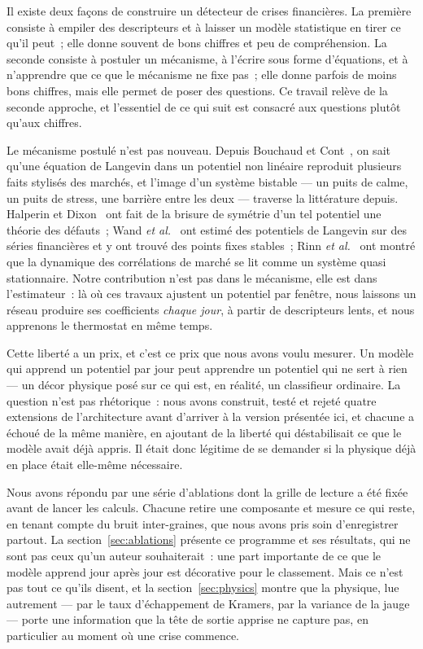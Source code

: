 \documentclass[11pt,a4paper]{article}
\begin{document}
Il existe deux façons de construire un détecteur de crises financières. La première consiste à empiler des descripteurs et à laisser un modèle statistique en tirer ce qu'il peut~; elle donne souvent de bons chiffres et peu de compréhension. La seconde consiste à postuler un mécanisme, à l'écrire sous forme d'équations, et à n'apprendre que ce que le mécanisme ne fixe pas~; elle donne parfois de moins bons chiffres, mais elle permet de poser des questions. Ce travail relève de la seconde approche, et l'essentiel de ce qui suit est consacré aux questions plutôt qu'aux chiffres.

Le mécanisme postulé n'est pas nouveau. Depuis Bouchaud et Cont~\cite{bouchaud1998}, on sait qu'une équation de Langevin dans un potentiel non linéaire reproduit plusieurs faits stylisés des marchés, et l'image d'un système bistable --- un puits de calme, un puits de stress, une barrière entre les deux --- traverse la littérature depuis. Halperin et Dixon~\cite{halperin2019} ont fait de la brisure de symétrie d'un tel potentiel une théorie des défauts~; Wand \emph{et al.}~\cite{wand2024} ont estimé des potentiels de Langevin sur des séries financières et y ont trouvé des points fixes stables~; Rinn \emph{et al.}~\cite{rinn2015} ont montré que la dynamique des corrélations de marché se lit comme un système quasi stationnaire. Notre contribution n'est pas dans le mécanisme, elle est dans l'estimateur~: là où ces travaux ajustent un potentiel par fenêtre, nous laissons un réseau produire ses coefficients \emph{chaque jour}, à partir de descripteurs lents, et nous apprenons le thermostat en même temps.

Cette liberté a un prix, et c'est ce prix que nous avons voulu mesurer. Un modèle qui apprend un potentiel par jour peut apprendre un potentiel qui ne sert à rien --- un décor physique posé sur ce qui est, en réalité, un classifieur ordinaire. La question n'est pas rhétorique~: nous avons construit, testé et rejeté quatre extensions de l'architecture avant d'arriver à la version présentée ici, et chacune a échoué de la même manière, en ajoutant de la liberté qui déstabilisait ce que le modèle avait déjà appris. Il était donc légitime de se demander si la physique déjà en place était elle-même nécessaire.

Nous avons répondu par une série d'ablations dont la grille de lecture a été fixée avant de lancer les calculs. Chacune retire une composante et mesure ce qui reste, en tenant compte du bruit inter-graines, que nous avons pris soin d'enregistrer partout. La section~\ref{sec:ablations} présente ce programme et ses résultats, qui ne sont pas ceux qu'un auteur souhaiterait~: une part importante de ce que le modèle apprend jour après jour est décorative pour le classement. Mais ce n'est pas tout ce qu'ils disent, et la section~\ref{sec:physics} montre que la physique, lue autrement --- par le taux d'échappement de Kramers, par la variance de la jauge --- porte une information que la tête de sortie apprise ne capture pas, en particulier au moment où une crise commence.
\end{document}
